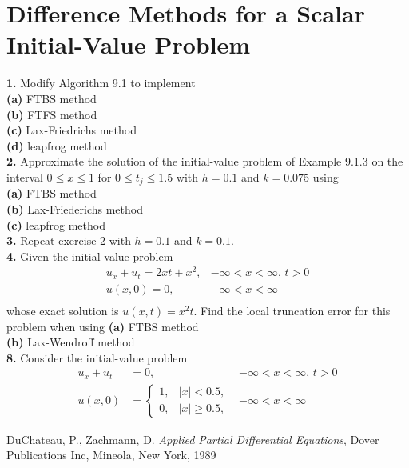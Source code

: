 \documentclass{amsbook}%
\theoremstyle{plain}
\numberwithin{equation}{section}
\begin{document}
	\section{Difference Methods for a Scalar Initial-Value Problem}

		\noindent\textbf{1.} Modify Algorithm 9.1 to implement\\
		\textbf{(a)} FTBS method\\
		\textbf{(b)} FTFS method\\
		\textbf{(c)} Lax-Friedrichs method\\
		\textbf{(d)} leapfrog method\\[12pt]
		
		\noindent\textbf{2.} Approximate the solution of the initial-value problem of Example 9.1.3 on the interval $0\leq x\leq 1$ for $0\leq t_j\leq 1.5$ with $h=0.1$ and $k=0.075$ using\\
		\textbf{(a)} FTBS method\\
		\textbf{(b)} Lax-Friederichs method\\
		\textbf{(c)} leapfrog method\\[12pt]
		
		\noindent\textbf{3.} Repeat exercise 2 with $h=0.1$ and $k=0.1$.\\[12pt]
		
		\noindent\textbf{4.} Given the initial-value problem 
		\begin{align}
			u_x+u_t=2xt+x^2, & -\infty<x<\infty,\, t>0\\
			u(x,0)=0, & -\infty<x<\infty\\
		\end{align}
		whose exact solution is $u(x,t)=x^2t$. Find the local truncation error for this problem when using
		\textbf{(a)} FTBS method\\
		\textbf{(b)} Lax-Wendroff method\\[12pt]
		
		\noindent\textbf{8.} Consider the initial-value problem
		\begin{align}
			u_x+u_t&=0, & -\infty<x<\infty,\, t>0\\
			u(x,0)&=
			\begin{cases}
				1, & |x|<0.5,\\
				0, & |x|\geq 0.5,
			\end{cases} & -\infty<x<\infty
		\end{align}		
			

\backmatter

\begin{thebibliography}{9}
DuChateau, P., Zachmann, D. \textit{Applied Partial Differential Equations}, Dover Publications Inc,
Mineola, New York, 1989

\end{thebibliography}
\end{document}
